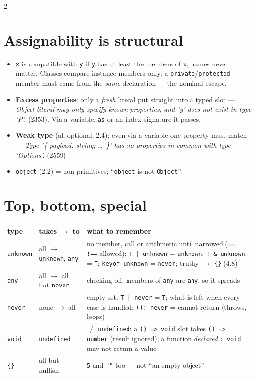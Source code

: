 \documentclass[8pt]{extarticle}
\newcommand\fa{=\pdfonly{\kern0pt}>}
\newcommand\eqq{=\pdfonly{\kern0pt}=}
\newcommand\neqq{!\pdfonly{\kern0pt}=\pdfonly{\kern0pt}=}
\newcommand\ct[1]{\texttt{#1}}
\newcommand\msg[1]{\textcolor{sheetRed}{\emph{#1}}}
\begin{document}
\begin{multicols}{2}
\raggedright
\footnotesize{}

\section{Assignability is structural}
\begin{itemize}\raggedright
  \item \ct{x} is compatible with \ct{y} if \ct{y} has at least the members of \ct{x}; names
        never matter. Classes compare instance members only; a \ct{private}/\ct{protected}
        member must come from the \emph{same} declaration — the nominal escape.
  \item \textbf{Excess properties}: only a \emph{fresh} literal put straight into a typed slot —
        \msg{Object literal may only specify known properties, and 'y' does not exist in type
        'P'.} (2353). Via a variable, \ct{as} or an index signature it passes.
  \item \textbf{Weak type} (all optional, 2.4): even via a variable one property must match —
        \msg{Type '\{ payload: string; \ldots\ \}' has no properties in common with type
        'Options'.} (2559)
  \item \ct{object} (2.2) = non-primitives; ``\ct{object} is not \ct{Object}''.
\end{itemize}

\section{Top, bottom, special}
{\scriptsize\setlength{\tabcolsep}{2pt}
\begin{tabular}{@{}>{\raggedright\arraybackslash}p{9mm}>{\raggedright\arraybackslash}p{15mm}>{\raggedright\arraybackslash}p{49mm}@{}}
\toprule
\textbf{type} & \textbf{takes $\to$ to} & \textbf{what to remember}\\
\midrule
\ct{unknown} & all $\to$ \ct{unknown}, \ct{any} & no member, call or arithmetic until narrowed
(\ct{\eqq}, \ct{\neqq} allowed); \ct{T | unknown} = \ct{unknown}, \ct{T \& unknown} = \ct{T};
\ct{keyof unknown} = \ct{never}; truthy $\to$ \ct{\{\}} (4.8)\\
\ct{any} & all $\to$ all but \ct{never} & checking off; members of \ct{any} are \ct{any}, so it
spreads\\
\ct{never} & none $\to$ all & empty set: \ct{T | never} = \ct{T}; what is left when every case
is handled; \ct{(): never} = cannot return (throws, loops)\\
\ct{void} & \ct{undefined} & $\ne$ \ct{undefined}: a \ct{() \fa{} void} slot takes
\ct{() \fa{} number} (result ignored); a function \emph{declared} \ct{: void} may not return a value\\
\ct{\{\}} & all but nullish & \ct{5} and \ct{""} too — not ``an empty object''\\
\bottomrule
\end{tabular}}


\end{multicols}
\end{document}
